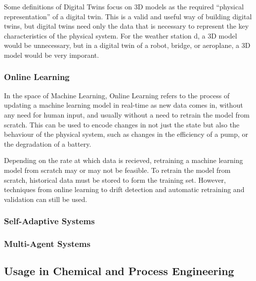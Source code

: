 Some definitions of Digital Twins focus on 3D models as the required ``physical representation'' of a digital twin. This is a valid and useful way of building digital twins, but digital twins need only the data that is necessary to represent the key characteristics of the physical system. For the weather station d, a 3D model would be unnecessary, but in a digital twin of a robot, bridge, or aeroplane, a 3D model would be very imporant.

\subsubsection{Online Learning}

In the space of Machine Learning, Online Learning refers to the process of updating a machine learning model in real-time as new data comes in, without any need for human input, and usually without a need to retrain the model from scratch. This can be used to encode changes in not just the state but also the behaviour of the physical system, such as changes in the efficiency of a pump, or the degradation of a battery.

Depending on the rate at which data is recieved, retraining a machine learning model from scratch may or may not be feasible. To retrain the model from scratch, historical data must be stored to form the training set. However, techniques from online learning to drift detection and automatic retraining and validation can still be used.

\subsubsection{Self-Adaptive Systems}



\subsubsection{Multi-Agent Systems}













\subsection{Usage in Chemical and Process Engineering}

